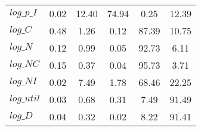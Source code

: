 \begin{center}
\begin{longtable}{lccccc}
$log\_p\_I  $	 & 	        0.02	 & 	       12.40	 & 	       74.94	 & 	        0.25	 & 	       12.39 \\ 
$log\_C     $	 & 	        0.48	 & 	        1.26	 & 	        0.12	 & 	       87.39	 & 	       10.75 \\ 
$log\_N     $	 & 	        0.12	 & 	        0.99	 & 	        0.05	 & 	       92.73	 & 	        6.11 \\ 
$log\_NC    $	 & 	        0.15	 & 	        0.37	 & 	        0.04	 & 	       95.73	 & 	        3.71 \\ 
$log\_NI    $	 & 	        0.02	 & 	        7.49	 & 	        1.78	 & 	       68.46	 & 	       22.25 \\ 
$log\_util  $	 & 	        0.03	 & 	        0.68	 & 	        0.31	 & 	        7.49	 & 	       91.49 \\ 
$log\_D     $	 & 	        0.04	 & 	        0.32	 & 	        0.02	 & 	        8.22	 & 	       91.41 \\ 
\end{longtable}
 \end{center}
